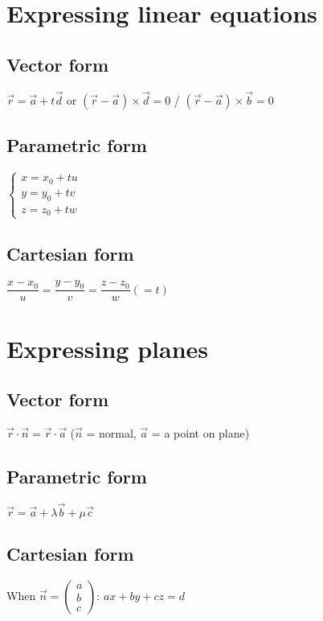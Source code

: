 \section{Expressing linear equations}

\subsection{Vector form}
$\vec{r}=\vec{a}+t\vec{d}$ or $(\vec{r}-\vec{a})\times\vec{d}=0$ / $(\vec{r}-\vec{a})\times\vec{b}=0$
\subsection{Parametric form}
$\begin{cases}
	x=x_0+tu\\
	y=y_0+tv\\
	z=z_0+tw
\end{cases}$
\subsection{Cartesian form}
$\dfrac{x-x_0}{u}=\dfrac{y-y_0}{v}=\dfrac{z-z_0}{w}(=t)$

\section{Expressing planes}
\subsection{Vector form}
$\vec{r} \cdot \vec{n} = \vec{r} \cdot \vec{a}$ ($\vec{n}$ = normal, $\vec{a}$ = a point on plane)
\subsection{Parametric form}
$\vec{r}=\vec{a}+\lambda\vec{b}+\mu\vec{c}$
\subsection{Cartesian form}
When $\vec{n} = \begin{pmatrix}a\\b\\c\end{pmatrix}$: $ax+by+cz=d$

